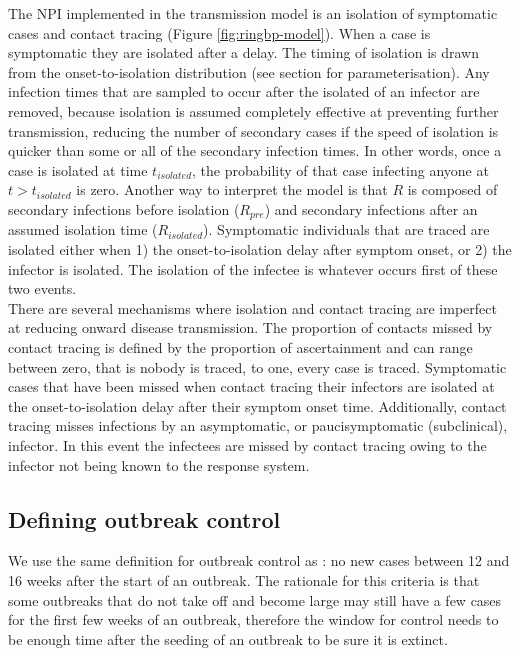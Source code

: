 \documentclass{article}
\begin{document}
The NPI implemented in the transmission model is an isolation of symptomatic cases and contact tracing (Figure \ref{fig:ringbp-model}). When a case is symptomatic they are isolated after a delay. The timing of isolation is drawn from the onset-to-isolation distribution (see  section for parameterisation). Any infection times that are sampled to occur after the isolated of an infector are removed, because isolation is assumed completely effective at preventing further transmission, reducing the number of secondary cases if the speed of isolation is quicker than some or all of the secondary infection times. In other words, once a case is isolated at time $t_{isolated}$, the probability of that case infecting anyone at $t > t_{isolated}$ is zero. Another way to interpret the model is that $R$ is composed of secondary infections before isolation ($R_{pre}$) and secondary infections after an assumed isolation time ($R_{isolated}$). Symptomatic individuals that are traced are isolated either when 1) the onset-to-isolation delay after symptom onset, or 2) the infector is isolated. The isolation of the infectee is whatever occurs first of these two events.  \\

There are several mechanisms where isolation and contact tracing are imperfect at reducing onward disease transmission. The proportion of contacts missed by contact tracing is defined by the proportion of ascertainment and can range between zero, that is nobody is traced, to one, every case is traced. Symptomatic cases that have been missed when contact tracing their infectors are isolated at the onset-to-isolation delay after their symptom onset time. Additionally, contact tracing misses infections by an asymptomatic, or paucisymptomatic (subclinical), infector. In this event the infectees are missed by contact tracing owing to the infector not being known to the response system. \\

\subsection*{Defining outbreak control}

We use the same definition for outbreak control as \cite{hellewellFeasibilityControllingCOVID192020}: no new cases between 12 and 16 weeks after the start of an outbreak. The rationale for this criteria is that some outbreaks that do not take off and become large may still have a few cases for the first few weeks of an outbreak, therefore the window for control needs to be enough time after the seeding of an outbreak to be sure it is extinct. \\
\end{document}
